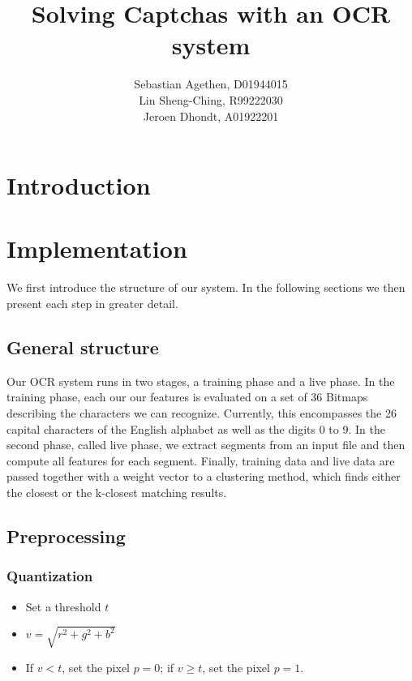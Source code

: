 \documentclass{article}
\begin{document}
\title{Solving Captchas with an OCR system}
\author{Sebastian Agethen, D01944015 \\ Lin Sheng-Ching, R99222030 \\ Jeroen Dhondt, A01922201 }

\onecolumn

\maketitle

\tableofcontents

\twocolumn

\section{Introduction}
\section{Implementation}
We first introduce the structure of our system. In the following sections we then present each step in greater detail.

\subsection{General structure}
Our OCR system runs in two stages, a training phase and a live phase. In the training phase, each our our features is evaluated on a set of 36 Bitmaps describing the characters we can recognize. Currently, this encompasses the 26 capital characters of the English alphabet as well as the digits 0 to 9. In the second phase, called live phase, we extract segments from an input file and then compute all features for each segment. Finally, training data and live data are passed together with a weight vector to a clustering method, which finds either the closest or the k-closest matching results.

\subsection{Preprocessing}

\subsubsection{Quantization}
\begin{itemize}
\item Set a threshold $t$
\item $v = \sqrt{r^2 + g^2 + b^2}$
\item If $v < t$, set the pixel $p = 0$; if $v \geq t$, set the pixel $p = 1$.
\end{itemize}
\end{document}
